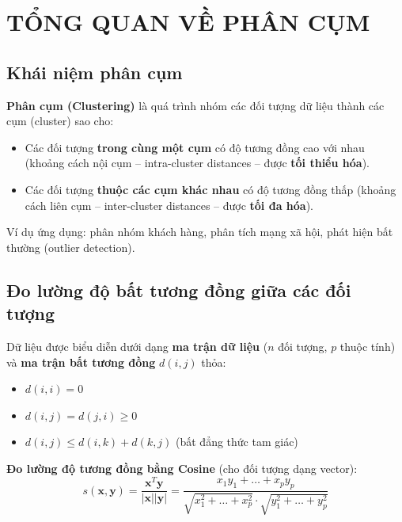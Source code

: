 \documentclass[10pt]{article}
\begin{document}
\onehalfspacing
\renewcommand{\arraystretch}{1.5}

\newcommand{\ChapterNum}{5}
\newcommand{\ChapterTitle}{PHÂN CỤM DỮ LIỆU (DATA CLUSTERING)}


\section{TỔNG QUAN VỀ PHÂN CỤM}

\subsection{Khái niệm phân cụm}

\textbf{Phân cụm (Clustering)} là quá trình nhóm các đối tượng dữ liệu thành các cụm (cluster) sao cho:
\begin{itemize}
    \item Các đối tượng \textbf{trong cùng một cụm} có độ tương đồng cao với nhau (khoảng cách nội cụm -- intra-cluster distances -- được \textbf{tối thiểu hóa}).
    \item Các đối tượng \textbf{thuộc các cụm khác nhau} có độ tương đồng thấp (khoảng cách liên cụm -- inter-cluster distances -- được \textbf{tối đa hóa}).
\end{itemize}

Ví dụ ứng dụng: phân nhóm khách hàng, phân tích mạng xã hội, phát hiện bất thường (outlier detection).

\subsection{Đo lường độ bất tương đồng giữa các đối tượng}

Dữ liệu được biểu diễn dưới dạng \textbf{ma trận dữ liệu} ($n$ đối tượng, $p$ thuộc tính) và \textbf{ma trận bất tương đồng} $d(i,j)$ thỏa:
\begin{itemize}
    \item $d(i,i) = 0$
    \item $d(i,j) = d(j,i) \geq 0$
    \item $d(i,j) \leq d(i,k) + d(k,j)$ (bất đẳng thức tam giác)
\end{itemize}

\textbf{Đo lường độ tương đồng bằng Cosine} (cho đối tượng dạng vector):
\[
s(\mathbf{x}, \mathbf{y}) = \frac{\mathbf{x}^T \mathbf{y}}{|\mathbf{x}||\mathbf{y}|} = \frac{x_1 y_1 + \dots + x_p y_p}{\sqrt{x_1^2 + \dots + x_p^2}\cdot\sqrt{y_1^2 + \dots + y_p^2}}
\]
\end{document}
